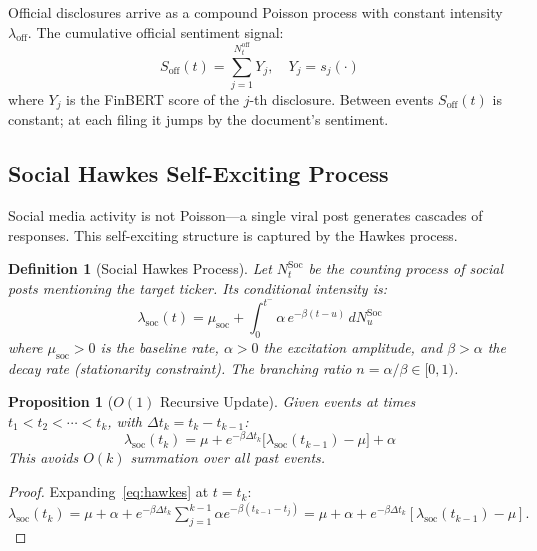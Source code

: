 \documentclass[10pt,twocolumn]{article}
\newtheorem{definition}{Definition}[section]
\newtheorem{proposition}{Proposition}[section]
\newcommand{\lamsoc}{\lambda_{\mathrm{soc}}}
\newcommand{\Soff}{S_{\mathrm{off}}}
\begin{document}
Official disclosures arrive as a compound Poisson process with constant
intensity $\lambda_{\mathrm{off}}$. The cumulative official sentiment signal:
\begin{equation}
\label{eq:soff}
\Soff(t) = \sum_{j=1}^{N^{\mathrm{off}}_t} Y_j, \quad Y_j = s_j(\cdot)
\end{equation}
where $Y_j$ is the FinBERT score of the $j$-th disclosure. Between events
$\Soff(t)$ is constant; at each filing it jumps by the document's sentiment.

\subsection{Social Hawkes Self-Exciting Process}

Social media activity is not Poisson---a single viral post generates cascades
of responses. This self-exciting structure is captured by the Hawkes process.

\begin{definition}[Social Hawkes Process]
\label{def:hawkes}
Let $N^{\mathrm{Soc}}_t$ be the counting process of social posts mentioning
the target ticker. Its conditional intensity is:
\begin{equation}
\label{eq:hawkes}
\lamsoc(t) = \mu_{\mathrm{soc}}
  + \int_0^{t^-}\!\alpha\,e^{-\beta(t-u)}\,dN^{\mathrm{Soc}}_u
\end{equation}
where $\mu_{\mathrm{soc}}>0$ is the baseline rate, $\alpha>0$ the excitation
amplitude, and $\beta>\alpha$ the decay rate (stationarity constraint).
The branching ratio $n=\alpha/\beta\in[0,1)$.
\end{definition}

\begin{proposition}[$O(1)$ Recursive Update]
\label{prop:hawkes}
Given events at times $t_1<t_2<\cdots<t_k$, with $\Delta t_k=t_k-t_{k-1}$:
\begin{equation}
\label{eq:recursion}
\lamsoc(t_k)=\mu+e^{-\beta\Delta t_k}\!\bigl[\lamsoc(t_{k-1})-\mu\bigr]+\alpha
\end{equation}
This avoids $O(k)$ summation over all past events.
\end{proposition}

\begin{proof}
Expanding~\eqref{eq:hawkes} at $t=t_k$:
$\lamsoc(t_k)=\mu+\alpha+e^{-\beta\Delta t_k}\sum_{j=1}^{k-1}\alpha e^{-\beta(t_{k-1}-t_j)}
=\mu+\alpha+e^{-\beta\Delta t_k}[\lamsoc(t_{k-1})-\mu].$
\end{proof}
\end{document}
